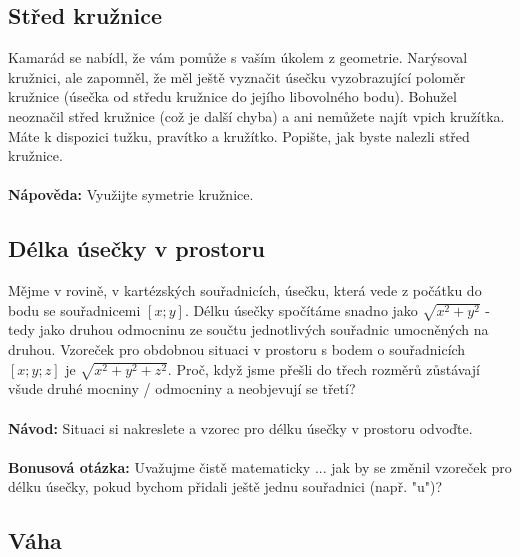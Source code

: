 \documentclass[a4paper,12pt]{article}
\begin{document}
\newpage

\subsection{Střed kružnice}

Kamarád se nabídl, že vám pomůže s vaším úkolem z geometrie. Narýsoval kružnici, ale zapomněl, že měl ještě vyznačit úsečku vyzobrazující poloměr kružnice (úsečka od středu kružnice do jejího libovolného bodu). Bohužel neoznačil střed kružnice (což je další chyba) a ani nemůžete najít vpich kružítka. Máte k dispozici tužku, pravítko a kružítko. Popište, jak byste nalezli střed kružnice.
\\ \\
\textbf{Nápověda:} Využijte symetrie kružnice.

\subsection{Délka úsečky v prostoru}

Mějme v rovině, v kartézských souřadnicích, úsečku, která vede z počátku do bodu se souřadnicemi $[x; y]$. Délku úsečky spočítáme snadno jako $\sqrt{x^2 + y^2}$ - tedy jako druhou odmocninu ze součtu jednotlivých souřadnic umocněných na druhou. Vzoreček pro obdobnou situaci v prostoru s bodem o souřadnicích $[x; y; z]$ je $\sqrt{x^2 + y^2 + z^2}$. Proč, když jsme přešli do třech rozměrů zůstávají všude druhé mocniny / odmocniny a neobjevují se třetí?
\\ \\
\textbf{Návod:} Situaci si nakreslete a vzorec pro délku úsečky v prostoru odvoďte.
\\ \\
\textbf{Bonusová otázka:} Uvažujme čistě matematicky ... jak by se změnil vzoreček pro délku úsečky, pokud bychom přidali ještě jednu souřadnici (např. "u")?

\subsection{Váha}
\end{document}

